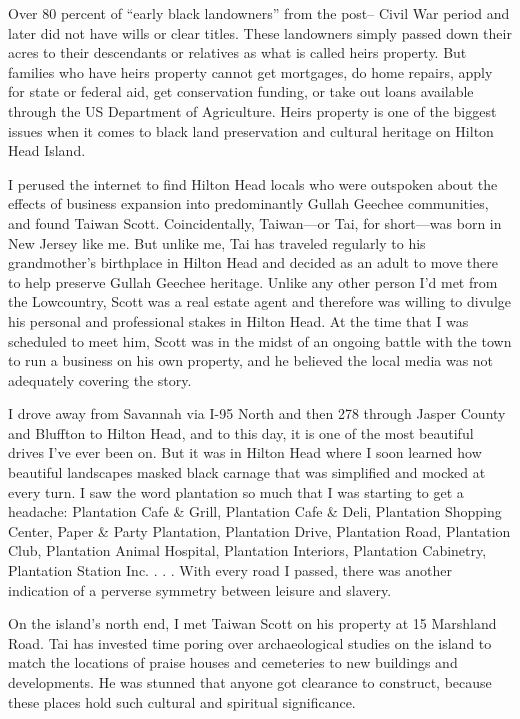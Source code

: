 Over 80 percent of ``early black landowners'' from the post-- Civil War
period and later did not have wills or clear titles. These landowners
simply passed down their acres to their descendants or relatives as what
is called heirs property. But families who have heirs property cannot
get mortgages, do home repairs, apply for state or federal aid, get
conservation funding, or take out loans available through the US
Department of Agriculture. Heirs property is one of the biggest issues
when it comes to black land preservation and cultural heritage on Hilton
Head Island.

I perused the internet to find Hilton Head locals who were outspoken
about the effects of business expansion into predominantly Gullah
Geechee communities, and found Taiwan Scott. Coincidentally, Taiwan---or
Tai, for short---was born in New Jersey like me. But unlike me, Tai has
traveled regularly to his grandmother's birthplace in Hilton Head and
decided as an adult to move there to help preserve Gullah Geechee
heritage. Unlike any other person I'd met from the Lowcountry, Scott was
a real estate agent and therefore was willing to divulge his personal
and professional stakes in Hilton Head. At the time that I was scheduled
to meet him, Scott was in the midst of an ongoing battle with the town
to run a business on his own property, and he believed the local media
was not adequately covering the story.

I drove away from Savannah via I-95 North and then 278 through Jasper
County and Bluffton to Hilton Head, and to this day, it is one of the
most beautiful drives I've ever been on. But it was in Hilton Head where
I soon learned how beautiful landscapes masked black carnage that was
simplified and mocked at every turn. I saw the word plantation so much
that I was starting to get a headache: Plantation Cafe \& Grill,
Plantation Cafe \& Deli, Plantation Shopping Center, Paper \& Party
Plantation, Plantation Drive, Plantation Road, Plantation Club,
Plantation Animal Hospital, Plantation Interiors, Plantation Cabinetry,
Plantation Station Inc. . . . With every road I passed, there was
another indication of a perverse symmetry between leisure and slavery.

On the island's north end, I met Taiwan Scott on his property at 15
Marshland Road. Tai has invested time poring over archaeological studies
on the island to match the locations of praise houses and cemeteries to
new buildings and developments. He was stunned that anyone got clearance
to construct, because these places hold such cultural and spiritual
significance.

